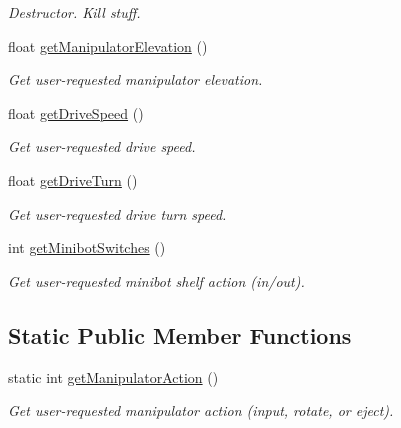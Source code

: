 \begin{DoxyCompactItemize}
\begin{DoxyCompactList}\small\item\em Destructor. Kill stuff. \item\end{DoxyCompactList}\item 
float \hyperlink{class_r_j_f_r_c2011_1_1_controller_a025f6f4702d475f523a8239ea8cff076}{getManipulatorElevation} ()
\begin{DoxyCompactList}\small\item\em Get user-\/requested manipulator elevation. \item\end{DoxyCompactList}\item 
float \hyperlink{class_r_j_f_r_c2011_1_1_controller_a9e1ef21d8c2d20194637bba06d853136}{getDriveSpeed} ()
\begin{DoxyCompactList}\small\item\em Get user-\/requested drive speed. \item\end{DoxyCompactList}\item 
float \hyperlink{class_r_j_f_r_c2011_1_1_controller_a6e215bd860fb57ba8b0e6e0e27f45e88}{getDriveTurn} ()
\begin{DoxyCompactList}\small\item\em Get user-\/requested drive turn speed. \item\end{DoxyCompactList}\item 
int \hyperlink{class_r_j_f_r_c2011_1_1_controller_af8731521c77fc853967b7f02f99cd4f2}{getMinibotSwitches} ()
\begin{DoxyCompactList}\small\item\em Get user-\/requested minibot shelf action (in/out). \item\end{DoxyCompactList}\end{DoxyCompactItemize}
\subsection*{Static Public Member Functions}
\begin{DoxyCompactItemize}
\item 
static int \hyperlink{class_r_j_f_r_c2011_1_1_controller_ad5503e733654faae028e022fdedca417}{getManipulatorAction} ()
\begin{DoxyCompactList}\small\item\em Get user-\/requested manipulator action (input, rotate, or eject). \item\end{DoxyCompactList}\end{DoxyCompactItemize}

